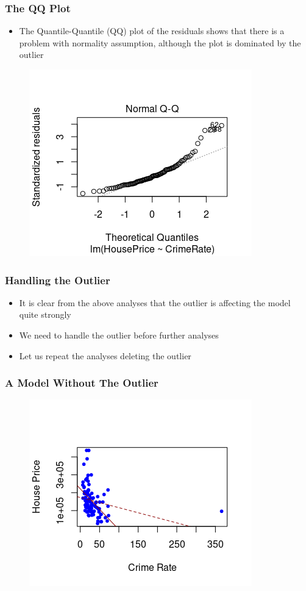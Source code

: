 \documentclass[compress]{beamer}
\begin{document}
\begin{frame}
\frametitle{\sc The QQ Plot}
	\begin{itemize}
		\item The Quantile-Quantile (QQ) plot of the residuals shows that there is a problem with normality assumption, although the plot is dominated by the outlier
    \end{itemize}	
    \vspace{-.1in}
    \begin{figure}[!ht]
		\centering
		\includegraphics[scale=0.8]{figs8/QQ-full.png}
	\end{figure}	
\end{frame}

\begin{frame}
\frametitle{\sc Handling the Outlier}
	\begin{itemize}
		\item It is clear from the above analyses that the outlier is affecting the model quite  strongly
		\item We need to handle the outlier before further analyses
		\item Let us repeat the analyses deleting the outlier
    \end{itemize}	
\end{frame}

\begin{frame}
\frametitle{\sc A Model Without The Outlier}
    \begin{figure}[!ht]
		\centering
		\includegraphics[scale=0.9]{figs8/reg-minus-outlier.png}
	\end{figure}
\end{frame}
\end{document}
